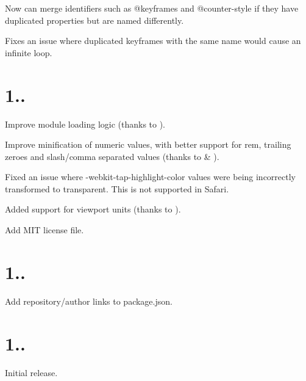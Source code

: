 \begin{DoxyItemize}
\item Now can merge identifiers such as {\ttfamily @keyframes} and {\ttfamily @counter-\/style} if they have duplicated properties but are named differently.
\item Fixes an issue where duplicated keyframes with the same name would cause an infinite loop.
\end{DoxyItemize}

\section*{1..}


\begin{DoxyItemize}
\item Improve module loading logic (thanks to ).
\item Improve minification of numeric values, with better support for {\ttfamily rem}, trailing zeroes and slash/comma separated values (thanks to  \& ).
\item Fixed an issue where {\ttfamily -\/webkit-\/tap-\/highlight-\/color} values were being incorrectly transformed to {\ttfamily transparent}. This is not supported in Safari.
\item Added support for viewport units (thanks to ).
\item Add M\+IT license file.
\end{DoxyItemize}

\section*{1..}


\begin{DoxyItemize}
\item Add repository/author links to package.\+json.
\end{DoxyItemize}

\section*{1..}


\begin{DoxyItemize}
\item Initial release. 
\end{DoxyItemize}